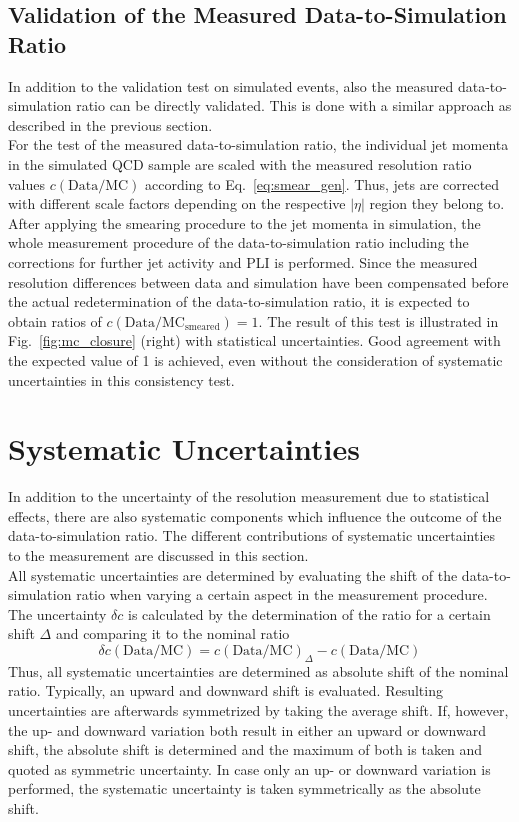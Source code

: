 \subsection{Validation of the Measured Data-to-Simulation Ratio}
\label{sec:jer_validation_ratio}
In addition to the validation test on simulated events, also the measured data-to-simulation ratio can be directly validated. This is done with a similar approach as described in the previous section.\\
For the test of the measured data-to-simulation ratio, the individual jet momenta in the simulated \pythia QCD sample are scaled with the measured resolution ratio values $c{(\mathrm{Data}/\mathrm{MC})}$ according to Eq.~\ref{eq:smear_gen}. Thus, jets are corrected with different scale factors depending on the respective $|\eta|$ region they belong to. After applying the smearing procedure to the jet momenta in simulation, the whole measurement procedure of the data-to-simulation ratio including the corrections for further jet activity and PLI is performed. Since the measured resolution differences between data and simulation have been compensated before the actual redetermination of the data-to-simulation ratio, it is expected to obtain ratios of $c\mathrm{(Data/MC_{smeared})} = 1$. The result of this test is illustrated in Fig.~\ref{fig:mc_closure} (right) with statistical uncertainties. Good agreement with the expected value of 1 is achieved, even without the consideration of systematic uncertainties in this consistency test.

\section{Systematic Uncertainties}
\label{sec:jer_syst_unc}
In addition to the uncertainty of the resolution measurement due to statistical effects, there are also systematic components which influence the outcome of the data-to-simulation ratio. The different contributions of systematic uncertainties to the measurement are discussed in this section.\\
All systematic uncertainties are determined by evaluating the shift of the data-to-simulation ratio when varying a certain aspect in the measurement procedure. The uncertainty $\delta c$ is calculated by the determination of the ratio for a certain shift $\Delta$ and comparing it to the nominal ratio 
 \begin{equation}
  \delta c{\mathrm{(Data/MC)}} = c{\mathrm{(Data/MC)}_{\Delta}} - c\mathrm{(Data/MC)}
 \end{equation} 
Thus, all systematic uncertainties are determined as absolute shift of the nominal ratio. Typically, an upward and downward shift is evaluated. Resulting uncertainties are afterwards symmetrized by taking the average shift. If, however, the up- and downward variation both result in either an upward or downward shift, the absolute shift is determined and the maximum of both is taken and quoted as symmetric uncertainty. In case only an up- or downward variation is performed, the systematic uncertainty is taken symmetrically as the absolute shift.   

